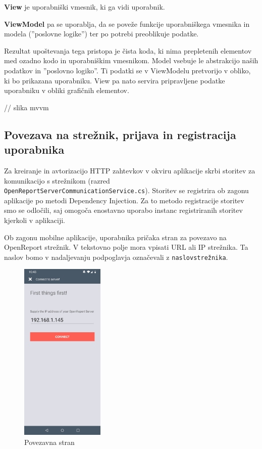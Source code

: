 \documentclass[a4paper, 12pt]{book}
\begin{document}
\textbf{View} je uporabniški vmesnik, ki ga vidi uporabnik.

\textbf{ViewModel} pa se uporablja, da se poveže funkcije uporabniškega vmesnika in modela (''poslovne logike'') ter po potrebi preoblikuje podatke.

Rezultat upoštevanja tega pristopa je čista koda, ki nima prepletenih elementov med ozadno kodo in uporabniškim vmesnikom.
Model vsebuje le abstrakcijo naših podatkov in ''poslovno logiko''.
Ti podatki se v ViewModelu pretvorijo v obliko, ki bo prikazana uporabniku.
View pa nato servira pripravljene podatke uporabniku v obliki grafičnih elementov.

// slika mvvm

\subsection{Povezava na strežnik, prijava in registracija uporabnika}

Za kreiranje in avtorizacijo HTTP zahtevkov v okviru aplikacije skrbi storitev za komunikacijo s strežnikom (razred \\\texttt{OpenReportServerCommunicationService.cs}).
Storitev se registrira ob zagonu aplikacije po metodi Dependency Injection.
Za to metodo registracije storitev smo se odločili, saj omogoča enostavno uporabo instanc registriranih storitev kjerkoli v aplikaciji.

Ob zagonu mobilne aplikacije, uporabnika pričaka stran za povezavo na OpenReport strežnik.
V tekstovno polje mora vpisati URL ali IP strežnika.
Ta naslov bomo v nadaljevanju podpoglavja označevali z \texttt{naslovstrežnika}.


\begin{figure}[H]
\begin{center}
\includegraphics[width=4cm]{app_connect}
\end{center}
\caption{Povezavna stran}
\label{app_connect}
\end{figure}
\end{document}
